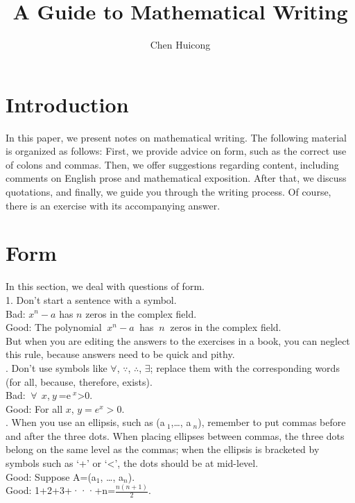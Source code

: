 \documentclass[12pt,a4paper]{article}  %
\title{A Guide to Mathematical Writing}
\date{\DTMnow}
\author{Chen Huicong 
}
\theoremstyle{definition}
\numberwithin{equation}{section}
\begin{document}
\maketitle

\section{Introduction}
In this paper, we present notes on mathematical writing. The following material is organized as follows: First, we provide advice on form, such as the correct use of colons and commas. Then, we offer suggestions regarding content, including comments on English prose and mathematical exposition. After that, we discuss quotations, and finally, we guide you through the writing process. Of course, there is an exercise with its accompanying answer.

\section{Form}
In this section, we deal with questions of form. \\
1. Don't start a sentence with a symbol. \\
\indent Bad: \(x^n-a\) has $n$ zeros in the complex field. 
\\
\indent Good: The polynomial \(~x^n-a~\) has $~n~$ zeros in the complex field. \\
But when you are editing the answers to the exercises in a book, you can neglect this rule, because answers need to be quick and pithy. \\

. Don't use symbols like $\forall$, $\because$, $\therefore$, $\exists$; replace them with the corresponding words (for all, because, therefore, exists).\\
\indent Bad: \(~\forall~\)$~x$,$~y~$=e$~^x$>0. \\
\indent Good: For all $x$, \(y=e^x>0
\). \\

. When you use an ellipsis, such as (a\(~_1\),\dots, a\(~_n\)), remember to put commas before and
after the three dots. When placing ellipses between commas, the three dots belong on the same level as the commas; when the ellipsis is bracketed by symbols such as `+' or `<', the dots should be at mid-level.\\
\indent Good: Suppose A=(a\(_1\), \dots , a\(_n\)).\\
\indent Good: 1+2+3+···+n=\(\frac{n(n+1)}{2}\).\\
\end{document}
